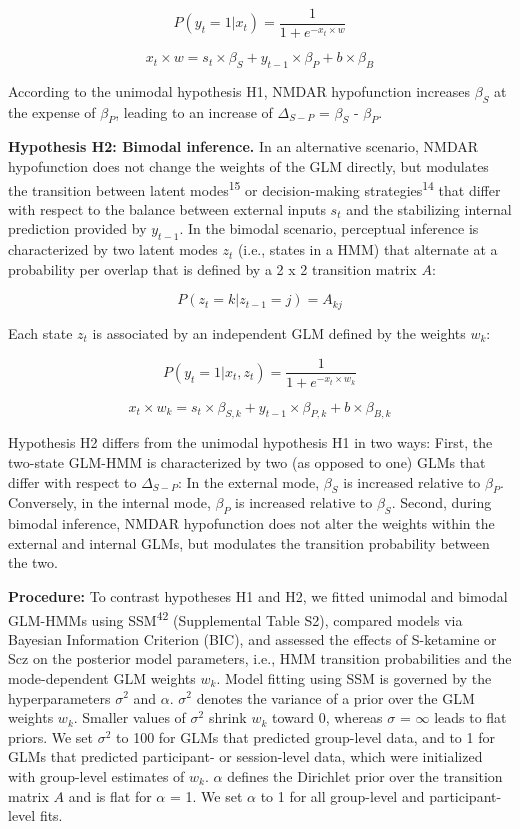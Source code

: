 \documentclass[
]{article}
\begin{document}
\[
P(y_t = 1 | x_t) = \frac{1}{1 + e^{-x_t \times w}} 
\]

\[
x_t \times w =  s_t \times \beta_S + y_{t-1} \times \beta_P  + b \times \beta_B  
\]

According to the unimodal hypothesis H1, NMDAR hypofunction increases
\(\beta_S\) at the expense of \(\beta_P\), leading to an increase of
\(\Delta_{S-P}\) = \(\beta_S\) - \(\beta_P\).

\textbf{Hypothesis H2: Bimodal inference.} In an alternative scenario,
NMDAR hypofunction does not change the weights of the GLM directly, but
modulates the transition between latent modes\textsuperscript{15} or
decision-making strategies\textsuperscript{14} that differ with respect
to the balance between external inputs \(s_t\) and the stabilizing
internal prediction provided by \(y_{t-1}\). In the bimodal scenario,
perceptual inference is characterized by two latent modes \(z_t\) (i.e.,
states in a HMM) that alternate at a probability per overlap that is
defined by a 2 x 2 transition matrix \(A\):

\[
P(z_t = k|z_{t-1} = j) = A_{kj} 
\]

Each state \(z_t\) is associated by an independent GLM defined by the
weights \(w_k\):

\[
P(y_t = 1 | x_t, z_t) = \frac{1}{1 + e^{-x_t \times w_k}} 
\]

\[
x_t \times w_k =  s_t \times \beta_{S,k} + y_{t-1} \times \beta_{P,k}  + b \times \beta_{B,k}  
\]

Hypothesis H2 differs from the unimodal hypothesis H1 in two ways:
First, the two-state GLM-HMM is characterized by two (as opposed to one)
GLMs that differ with respect to \(\Delta_{S-P}\): In the external mode,
\(\beta_S\) is increased relative to \(\beta_P\). Conversely, in the
internal mode, \(\beta_P\) is increased relative to \(\beta_S\). Second,
during bimodal inference, NMDAR hypofunction does not alter the weights
within the external and internal GLMs, but modulates the transition
probability between the two.

\textbf{Procedure:} To contrast hypotheses H1 and H2, we fitted unimodal
and bimodal GLM-HMMs using SSM\textsuperscript{42} (Supplemental Table
S2), compared models via Bayesian Information Criterion (BIC), and
assessed the effects of S-ketamine or Scz on the posterior model
parameters, i.e., HMM transition probabilities and the mode-dependent
GLM weights \(w_k\). Model fitting using SSM is governed by the
hyperparameters \(\sigma^2\) and \(\alpha\). \(\sigma^2\) denotes the
variance of a prior over the GLM weights \(w_k\). Smaller values of
\(\sigma^2\) shrink \(w_k\) toward 0, whereas \(\sigma\) = \(\infty\)
leads to flat priors. We set \(\sigma^2\) to 100 for GLMs that predicted
group-level data, and to 1 for GLMs that predicted participant- or
session-level data, which were initialized with group-level estimates of
\(w_k\). \(\alpha\) defines the Dirichlet prior over the transition
matrix \(A\) and is flat for \(\alpha\) = 1. We set \(\alpha\) to 1 for
all group-level and participant-level fits.
\end{document}

